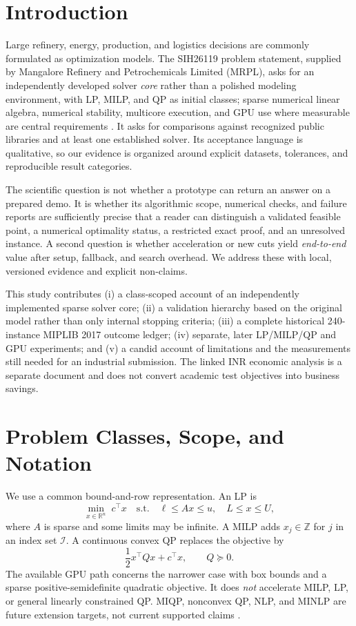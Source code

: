\documentclass[10pt,a4paper,twocolumn]{article}
\newcommand{\R}{\mathbb{R}}
\begin{document}
\section{Introduction}

Large refinery, energy, production, and logistics decisions are commonly formulated as optimization models. The SIH26119 problem statement, supplied by Mangalore Refinery and Petrochemicals Limited (MRPL), asks for an independently developed solver \emph{core} rather than a polished modeling environment, with LP, MILP, and QP as initial classes; sparse numerical linear algebra, numerical stability, multicore execution, and GPU use where measurable are central requirements \cite{ps}. It asks for comparisons against recognized public libraries and at least one established solver. Its acceptance language is qualitative, so our evidence is organized around explicit datasets, tolerances, and reproducible result categories.

The scientific question is not whether a prototype can return an answer on a prepared demo. It is whether its algorithmic scope, numerical checks, and failure reports are sufficiently precise that a reader can distinguish a validated feasible point, a numerical optimality status, a restricted exact proof, and an unresolved instance. A second question is whether acceleration or new cuts yield \emph{end-to-end} value after setup, fallback, and search overhead. We address these with local, versioned evidence and explicit non-claims.

This study contributes (i) a class-scoped account of an independently implemented sparse solver core; (ii) a validation hierarchy based on the original model rather than only internal stopping criteria; (iii) a complete historical 240-instance MIPLIB 2017 outcome ledger; (iv) separate, later LP/MILP/QP and GPU experiments; and (v) a candid account of limitations and the measurements still needed for an industrial submission. The linked INR economic analysis is a separate document and does not convert academic test objectives into business savings.

\section{Problem Classes, Scope, and Notation}

We use a common bound-and-row representation. An LP is
\begin{equation}
 \min_{x\in\R^n}\;c^\top x\quad
 \text{s.t.}\quad \ell\leq Ax\leq u,\quad L\leq x\leq U,
 \label{eq:lp}
\end{equation}
where $A$ is sparse and some limits may be infinite. A MILP adds $x_j\in\mathbb{Z}$ for $j$ in an index set $\mathcal I$. A continuous convex QP replaces the objective by
\begin{equation}
 \frac12x^\top Qx+c^\top x,\qquad Q\succeq 0.
 \label{eq:qp}
\end{equation}
The available GPU path concerns the narrower case with box bounds and a sparse positive-semidefinite quadratic objective. It does \emph{not} accelerate MILP, LP, or general linearly constrained QP. MIQP, nonconvex QP, NLP, and MINLP are future extension targets, not current supported claims \cite{arch}.
\end{document}
